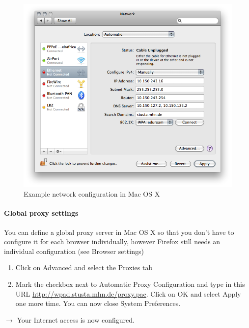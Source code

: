 \documentclass[a4paper,12pt]{scrartcl}
\begin{document}
\begin{enumerate}
\begin{figure}[h!]
\begin{minipage}[c]{0.38\linewidth}
        \end{minipage}
        \begin{minipage}[c]{0.60\linewidth}
          \centering
          \includegraphics[width=\linewidth,keepaspectratio]{Bilder/IP_Mac_EN}
          \caption{Example network configuration in Mac OS X}
        \end{minipage}
      \end{figure}
\end{enumerate}

\paragraph*{Global proxy settings}
You can define a global proxy server in Mac OS X so that you don't have to configure it for each browser individually, however Firefox still needs an individual configuration (see Browser settings)
\begin{enumerate}
    \item Click on Advanced and select the Proxies tab
    \item Mark the checkbox next to Automatic Proxy Configuration and type in this URL \url{http://wpad.stusta.mhn.de/proxy.pac}. Click on OK and select Apply one more time. You can now close System Preferences.
\end{enumerate}
$\rightarrow$ Your Internet access is now configured.
\end{document}
